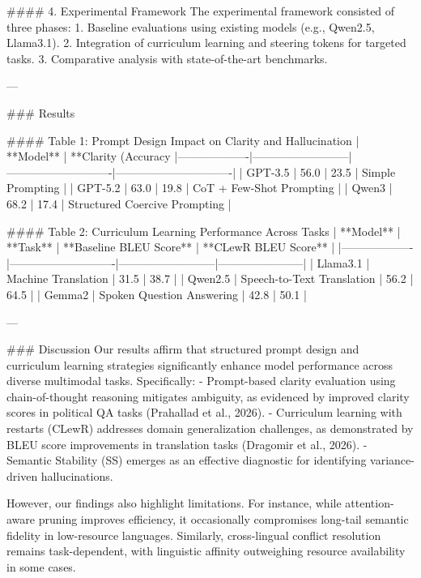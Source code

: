 #### 4. Experimental Framework  
The experimental framework consisted of three phases:  
1. Baseline evaluations using existing models (e.g., Qwen2.5, Llama3.1).  
2. Integration of curriculum learning and steering tokens for targeted tasks.  
3. Comparative analysis with state-of-the-art benchmarks.

---

### Results  

#### Table 1: Prompt Design Impact on Clarity and Hallucination  
| **Model**        | **Clarity (Accuracy %
|-------------------|--------------------------|----------------------------|-------------------------------|  
| GPT-3.5          | 56.0                     | 23.5                       | Simple Prompting             |  
| GPT-5.2          | 63.0                     | 19.8                       | CoT + Few-Shot Prompting      |  
| Qwen3            | 68.2                     | 17.4                       | Structured Coercive Prompting |  

#### Table 2: Curriculum Learning Performance Across Tasks  
| **Model**        | **Task**                   | **Baseline BLEU Score** | **CLewR BLEU Score** |  
|-------------------|----------------------------|--------------------------|-----------------------|  
| Llama3.1         | Machine Translation        | 31.5                     | 38.7                  |  
| Qwen2.5          | Speech-to-Text Translation | 56.2                     | 64.5                  |  
| Gemma2           | Spoken Question Answering  | 42.8                     | 50.1                  |  

---

### Discussion  
Our results affirm that structured prompt design and curriculum learning strategies significantly enhance model performance across diverse multimodal tasks. Specifically:  
- Prompt-based clarity evaluation using chain-of-thought reasoning mitigates ambiguity, as evidenced by improved clarity scores in political QA tasks (Prahallad et al., 2026).  
- Curriculum learning with restarts (CLewR) addresses domain generalization challenges, as demonstrated by BLEU score improvements in translation tasks (Dragomir et al., 2026).  
- Semantic Stability (SS) emerges as an effective diagnostic for identifying variance-driven hallucinations.  

However, our findings also highlight limitations. For instance, while attention-aware pruning improves efficiency, it occasionally compromises long-tail semantic fidelity in low-resource languages. Similarly, cross-lingual conflict resolution remains task-dependent, with linguistic affinity outweighing resource availability in some cases.

